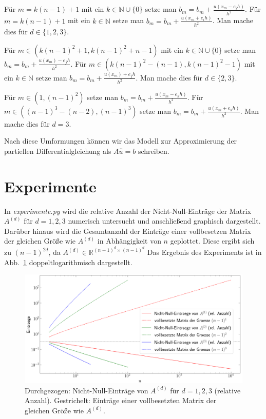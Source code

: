 \documentclass[smallheadings]{scrartcl}
\begin{document}
Für $m = k(n-1)+1$ mit ein $k \in \mathbb{N}\cup \{0\}$ setze man $b_m = b_m + \frac{u(x_m - e_ih)}{h^2}$. Für $m = k(n-1) +1$ mit ein $k \in \mathbb{N}$ setze man $b_m = b_m + \frac{u(x_m + e_ih)}{h^2}$. Man mache dies für $d\in \{1, 2, 3\}$.

Für $m \in (k(n-1)^2+1, k(n-1)^2+n-1)$ mit ein $k \in \mathbb{N}\cup \{0\}$ setze man $b_m = b_m + \frac{u(x_m)-e_jh}{h^2}$. Für $m \in (k(n-1)^2-(n-1), k(n-1)^2-1)$ mit ein $k \in \mathbb{N}$ setze man $b_m = b_m + \frac{u(x_m)+e_jh}{h^2}$.  Man mache dies für $d\in \{2, 3\}$.

Für $m\in (1, (n-1)^2)$ setze man $b_m = b_m + \frac{u(x_m-e_kh)}{h^2}$. Für $m\in ((n-1)^3-(n-2), (n-1)^3)$ setze man $b_m = b_m + \frac{u(x_m+e_kh)}{h^2}$.  Man mache dies für $d=3$.

Nach diese Umformungen können wir das Modell zur Approximierung der partiellen Differentialgleichung als $A\hat{u}=b$ schreiben.

\section{Experimente}

In \textit{experimente.py} wird die relative Anzahl der Nicht-Null-Einträge der Matrix $A^{(d)}$ für $d=1,2,3$ numerisch untersucht und anschließend graphisch dargestellt. Darüber hinaus wird die Gesamtanzahl der Einträge einer vollbesetzen Matrix der gleichen Größe wie $A^{(d)}$ in Abhängigkeit von $n$ geplottet. Diese ergibt sich zu $(n-1)^{2d}$, da $A^{(d)}\in\mathbb{R}^{(n-1)^d\times(n-1)^d}$ Das Ergebnis des Experiments ist in Abb.~\ref{im:nn_eintr} doppeltlogarithmisch dargestellt.

\begin{figure}[H]
\includegraphics[width=\textwidth]{Bilder/nn_eintraege}

\caption{Durchgezogen: Nicht-Null-Einträge von $A^{(d)}$ für $d=1,2,3$ (relative Anzahl). Gestrichelt: Einträge einer vollbesetzten Matrix der gleichen Größe wie $A^{(d)}$.}
\label{im:nn_eintr}
\end{figure}
\end{document}
